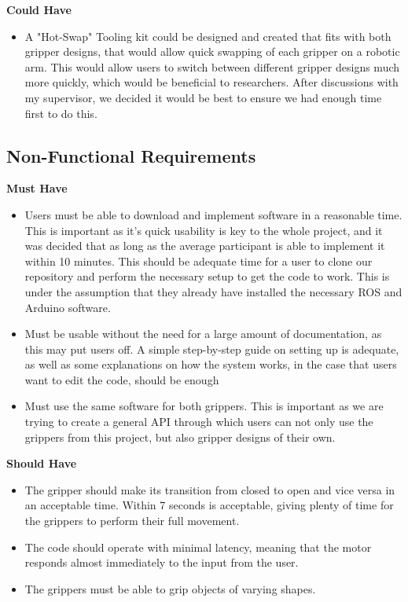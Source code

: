 \documentclass{l4proj}
\begin{document}
\textbf{Could Have}
\begin{itemize}
	\item A "Hot-Swap" Tooling kit could be designed and created that fits with both gripper designs, that would allow quick swapping of each gripper on a robotic arm. This would allow users to switch between different gripper designs much more quickly, which would be beneficial to researchers. After discussions with my supervisor, we decided it would be best to ensure we had enough time first to do this. 
\end{itemize}


\subsection{Non-Functional Requirements}

\textbf{Must Have}
\begin{itemize}
	\item Users must be able to download and implement software in a reasonable time. This is important as it's quick usability is key to the whole project, and it was decided that as long as the average participant is able to implement it within 10 minutes. This should be adequate time for a user to clone our repository and perform the necessary setup to get the code to work. This is under the assumption that they already have installed the necessary ROS and Arduino software. 
	\item Must be usable without the need for a large amount of documentation, as this may put users off. A simple step-by-step guide on setting up is adequate, as well as some explanations on how the system works, in the case that users want to edit the code, should be enough
	\item Must use the same software for both grippers. This is important as we are trying to create a general API through which users can not only use the grippers from this project, but also gripper designs of their own. 
\end{itemize}

\textbf{Should Have}
\begin{itemize}
	\item The gripper should make its transition from closed to open and vice versa in an acceptable time. Within 7 seconds is acceptable, giving plenty of time for the grippers to perform their full movement. 
	\item The code should operate with minimal latency, meaning that the motor responds almost immediately to the input from the user. 
	\item The grippers must be able to grip objects of varying shapes.
\end{itemize}
\end{document}
